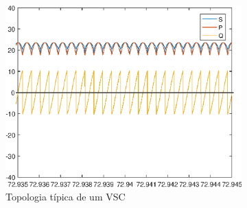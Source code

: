 
\begin{figure}[!htb] %
	\centering
	\begin{subfigure}[b]{0.48\textwidth}
		\centering
		\includegraphics[width=\textwidth]{Cap4/Figuras/resultados_unfilt_4.eps}
		\caption{Topologia típica de um VSC} 
		\label{fig:resultados_unfilt_4.eps}
	\end{subfigure}%
		\hfill
	\begin{subfigure}[b]{0.48\textwidth}  
		\centering 

\end{subfigure}
\end{figure}
